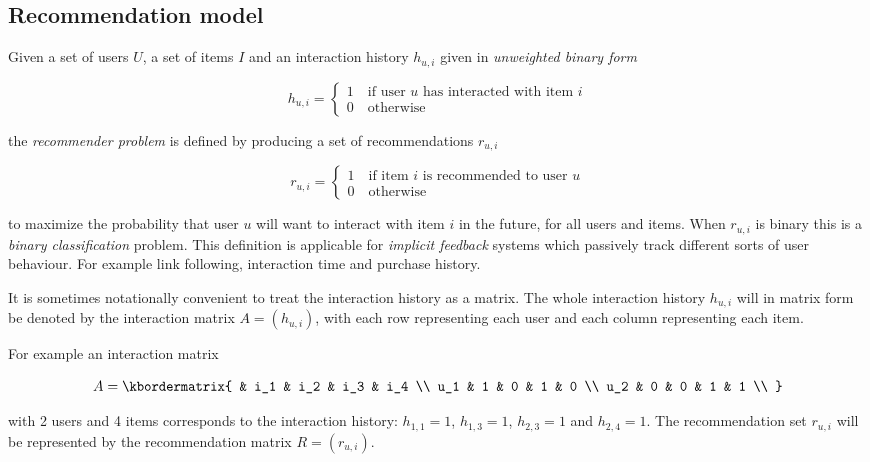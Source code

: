
\subsection{Recommendation model}\label{sec:background:theory:model}

Given a set of users $U$, a set of items $I$ and an interaction history $h_{u, i}$ given in \textit{unweighted binary form}

\begin{equation}\label{eq:hist}
    h_{u, i} = \begin{cases}
        1 \quad \text{if user $u$ has interacted with item $i$} \\
        0 \quad \text{otherwise}
    \end{cases}
\end{equation}

the \textit{recommender problem} is defined by producing a set of recommendations $r_{u, i}$

\begin{equation}\label{eq:binrec}
    r_{u, i} = \begin{cases}
        1 \quad \text{if item $i$ is recommended to user $u$} \\
        0 \quad \text{otherwise}
    \end{cases}
\end{equation}

to maximize the probability that user $u$ will want to interact with item $i$ in the future, for all users and items.  When $r_{u, i}$ is binary this is a \textit{binary classification} problem. This definition is applicable for \textit{implicit feedback} systems which passively track different sorts of user behaviour. For example link following, interaction time and purchase history.

It is sometimes notationally convenient to treat the interaction history as a matrix. The whole interaction history $h_{u, i}$ will in matrix form be denoted by the interaction matrix $A = (h_{u, i})$, with each row representing each user and each column representing each item.

For example an interaction matrix

\[
  A = \kbordermatrix{
    &   i_1 & i_2 & i_3 & i_4 \\
    u_1 & 1 & 0 & 1 & 0 \\
    u_2 & 0 & 0 & 1 & 1 \\
  }
\]

with 2 users and 4 items corresponds to the interaction history: $h_{1, 1} = 1$, $h_{1, 3} = 1$, $h_{2, 3} = 1$ and $h_{2, 4} = 1$.  The recommendation set $r_{u, i}$ will be represented by the recommendation matrix $R = (r_{u, i})$.

